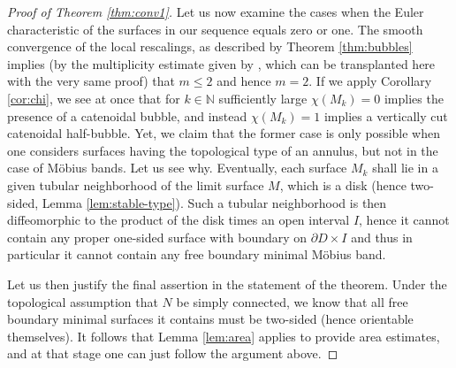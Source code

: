 \documentclass[10pt]{amsart}
\newcounter{cas}
\theoremstyle{definition}
\begin{document}
\begin{proof}[Proof of Theorem \ref{thm:conv1}]
Let us now examine the cases when the Euler characteristic of the surfaces in our sequence equals zero or one. The smooth convergence of the local rescalings, as described by Theorem \ref{thm:bubbles} implies (by the multiplicity estimate given by \cite[Prop.\,13]{ABCS18}, which can be transplanted here with the very same proof) that $m\leq 2$ and hence $m=2$.
If we apply Corollary \ref{cor:chi}, we see at once that for $k\in\mathbb{N}$ sufficiently large $\chi(M_k)=0$ implies the presence of a catenoidal bubble, and instead $\chi(M_k)=1$ implies a vertically cut catenoidal half-bubble. Yet, we claim that the former case is only possible when one considers surfaces having the topological type of an annulus, but not in the case of Möbius bands. Let us see why.
Eventually, each surface $M_k$ shall lie in a given tubular neighborhood of the limit surface $M$, which is a disk (hence two-sided, \cf Lemma \ref{lem:stable-type}). Such a tubular neighborhood is then diffeomorphic to the product of the disk times an open interval $I$, hence it cannot contain any proper one-sided surface with boundary on $\partial D\times I$ and thus in particular it cannot contain any free boundary minimal Möbius band.

Let us then justify the final assertion in the statement of the theorem. Under the topological assumption that $N$ be simply connected, we know that all free boundary minimal surfaces it contains must be two-sided (hence orientable themselves). It follows that Lemma \ref{lem:area} applies to provide area estimates, and at that stage one can just follow the argument above.
\end{proof}
\end{document}
